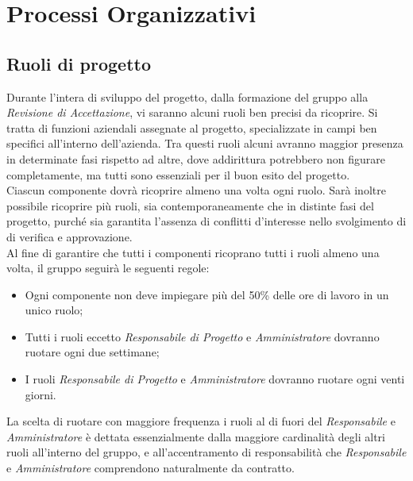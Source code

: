 \documentclass{scalatekids-article}
\begin{document}

\section{Processi Organizzativi}


\subsection{Ruoli di progetto}

Durante l'intera  di sviluppo del progetto, dalla formazione del gruppo alla
\textit{Revisione di Accettazione}, vi saranno alcuni ruoli ben precisi da ricoprire. Si
tratta di funzioni aziendali assegnate al progetto, specializzate in campi ben
specifici all'interno dell'azienda. Tra questi ruoli alcuni avranno maggior
presenza in determinate fasi rispetto ad altre, dove addirittura
potrebbero non figurare completamente, ma tutti sono essenziali per il buon
esito del progetto.\\ Ciascun componente dovrà ricoprire almeno una volta ogni
ruolo. Sarà inoltre possibile ricoprire più ruoli, sia contemporaneamente che in
distinte fasi del progetto, purché sia garantita l'assenza di conflitti
d'interesse nello svolgimento di  di verifica e approvazione.\\
Al fine di garantire che tutti i componenti ricoprano tutti i ruoli almeno una volta, il gruppo seguirà le seguenti regole:
\begin{itemize}
\item Ogni componente non deve impiegare più del 50\% delle ore di lavoro in un unico ruolo;
\item Tutti i ruoli eccetto \textit{Responsabile di Progetto} e \textit{Amministratore} dovranno ruotare ogni due settimane;
\item I ruoli \textit{Responsabile di Progetto} e \textit{Amministratore} dovranno ruotare ogni venti giorni.
\end{itemize}
La scelta di ruotare con maggiore frequenza i ruoli al di fuori del
\textit{Responsabile} e \textit{Amministratore} è dettata essenzialmente dalla
maggiore cardinalità degli altri ruoli all'interno del gruppo, e
all'accentramento di responsabilità che \textit{Responsabile} e
\textit{Amministratore} comprendono naturalmente da contratto.
\end{document}
